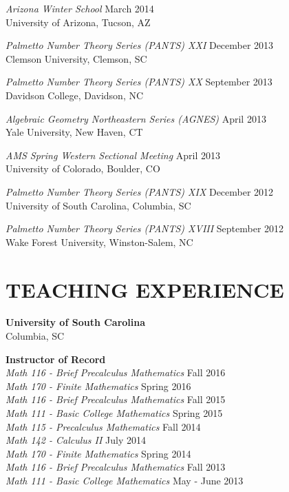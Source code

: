 \documentclass[line,overlapped]{res}
\begin{document}
\begin{resume}
  \textsl{Arizona Winter School} \hfill March 2014\\
  University of Arizona, Tucson, AZ

  \textsl{Palmetto Number Theory Series (PANTS) XXI} \hfill December 2013\\
  Clemson University, Clemson, SC

  \textsl{Palmetto Number Theory Series (PANTS) XX} \hfill September 2013\\
  Davidson College, Davidson, NC

  \textsl{Algebraic Geometry Northeastern Series (AGNES)} \hfill April 2013\\
  Yale University, New Haven, CT

  \textsl{AMS Spring Western Sectional Meeting} \hfill April 2013\\
  University of Colorado, Boulder, CO

  \textsl{Palmetto Number Theory Series (PANTS) XIX} \hfill December 2012\\
  University of South Carolina, Columbia, SC

  \textsl{Palmetto Number Theory Series (PANTS) XVIII} \hfill September 2012\\
  Wake Forest University, Winston-Salem, NC

  \newpage

  \section{TEACHING EXPERIENCE}
  \textbf{University of South Carolina}\\Columbia, SC
  
  \textbf{Instructor of Record}\\
  \textsl{Math 116 - Brief Precalculus Mathematics} \hfill Fall 2016\\
  \textsl{Math 170 - Finite Mathematics} \hfill Spring 2016\\
  \textsl{Math 116 - Brief Precalculus Mathematics} \hfill Fall 2015\\
  \textsl{Math 111 - Basic College Mathematics} \hfill Spring 2015\\
  \textsl{Math 115 - Precalculus Mathematics} \hfill Fall 2014\\
  \textsl{Math 142 - Calculus II} \hfill July 2014\\
  \textsl{Math 170 - Finite Mathematics} \hfill Spring 2014\\
  \textsl{Math 116 - Brief Precalculus Mathematics} \hfill Fall 2013\\
  \textsl{Math 111 - Basic College Mathematics} \hfill May - June 2013


\end{resume}
\end{document}
